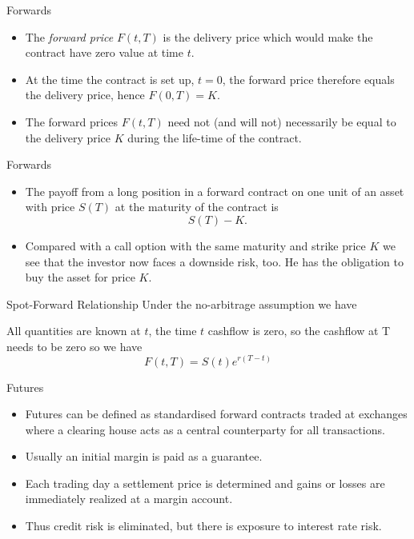 {Forwards}
\begin{itemize}
\item<1-> The {\it forward
price} $F(t,T)$ is the delivery price which would make the
contract have zero value at time $t$.
\item<2-> At the time the contract is set up, $t=0$,
the forward price therefore equals the delivery price, hence
$F(0,T) = K$.
\item<3->
The forward prices $F(t,T)$ need not (and will not)
necessarily be equal to the delivery price $K$ during the
life-time of the contract.
\end{itemize}

{Forwards}
\begin{itemize}
\item<1->
The payoff from a long position in a forward contract on one unit
of an asset with price $S(T)$ at the maturity of the contract is
$$ S(T)-K.$$
\item<2-> Compared with a call option with the same maturity
and strike price $K$ we see that the investor now faces a downside
risk, too. He has the obligation to buy the asset for price $K$.
\end{itemize}

{Spot-Forward Relationship}
Under the no-arbitrage assumption we have

\begin{center}
\end{center}

All quantities are known at $t$, the time $t$ cashflow is zero, so the cashflow at T needs to be zero so we have $$F(t,T) = S(t)e^{r(T-t)}$$

{Futures}
\begin{itemize}
\item<1-> Futures can be defined as standardised forward contracts traded at exchanges where a clearing house acts as a central counterparty for all transactions.
\item<2-> Usually an initial margin is paid as a guarantee.
\item<3-> Each trading day a settlement price is determined and gains or losses are immediately realized at a margin account.
\item<4-> Thus credit risk is eliminated, but there is exposure to interest rate risk.

\end{itemize}

